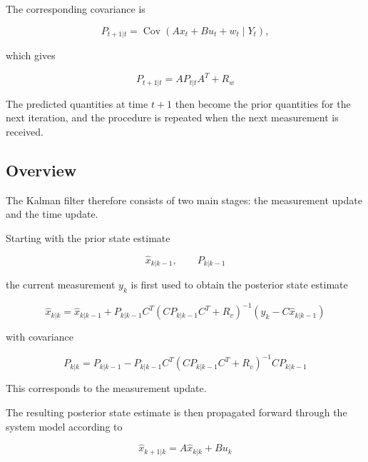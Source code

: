 The corresponding covariance is

\begin{equation}
    P_{t+1|t}
    =
    \operatorname{Cov}
    (Ax_t+Bu_t+w_t \mid Y_t),
\end{equation}

which gives

\begin{equation}
    \boxed{
    P_{t+1|t}
    =
    AP_{t|t}A^T+R_w
    }
\end{equation}

The predicted quantities at time \(t+1\) then become the prior quantities for
the next iteration, and the procedure is repeated when the next measurement
is received.


\subsection{Overview}
\label{subsec:kalman_overview}

The Kalman filter therefore consists of two main stages: the measurement
update and the time update.

Starting with the prior state estimate

\begin{equation}
    \hat{x}_{k|k-1},
    \qquad
    P_{k|k-1}
\end{equation}

the current measurement \(y_k\) is first used to obtain the posterior state
estimate

\begin{equation}
    \hat{x}_{k|k}
    =
    \hat{x}_{k|k-1}
    +
    P_{k|k-1}C^T
    \left(
        CP_{k|k-1}C^T+R_v
    \right)^{-1}
    \left(
        y_k-C\hat{x}_{k|k-1}
    \right)
\end{equation}

with covariance

\begin{equation}
    P_{k|k}
    =
    P_{k|k-1}
    -
    P_{k|k-1}C^T
    \left(
        CP_{k|k-1}C^T+R_v
    \right)^{-1}
    CP_{k|k-1}
\end{equation}

This corresponds to the measurement update.

The resulting posterior state estimate is then propagated forward through the
system model according to

\begin{equation}
    \hat{x}_{k+1|k}
    =
    A\hat{x}_{k|k}
    +
    Bu_k
\end{equation}

